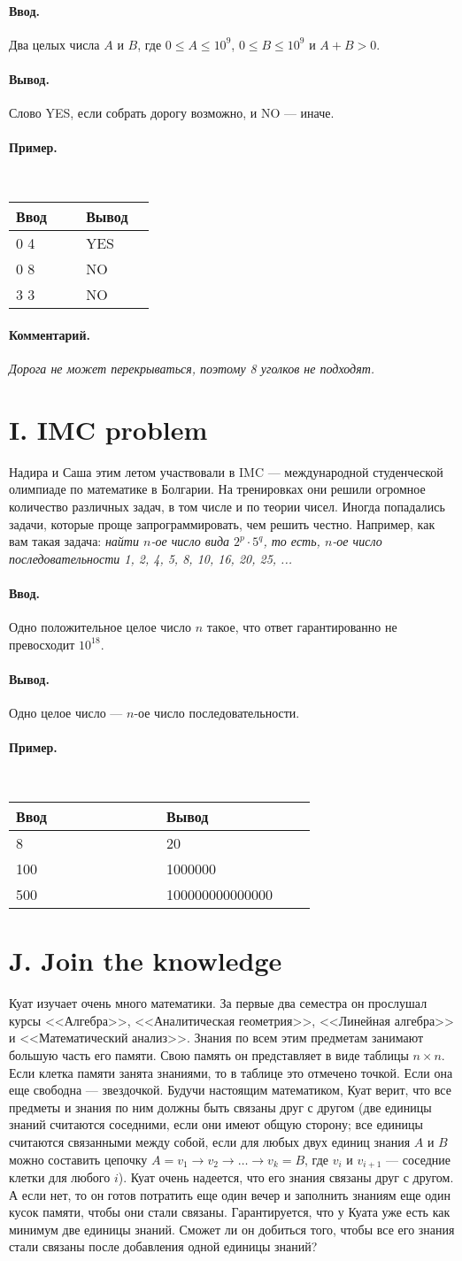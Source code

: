 \documentclass[10pt, a5paper]{article}
\newcommand{\informat}[1]
{
	\paragraph{Ввод.\\} #1
}
\newcommand{\outformat}[1]
{
	\paragraph{Вывод.\\} #1
}
\newcommand{\exampleee}[6]
{
	\paragraph{Пример.\\}
	{\tt
	\begin{tabular}{|p{0.4\linewidth}|p{0.4\linewidth}|}
	\hline
	Ввод 	& Вывод  	\\
	\hline
	#1 		& #2 		\\
	\hline
	#3		& #4		\\
	\hline
	#5		& #6		\\
	\hline
	\end{tabular}
	}
}
\newcommand{\excomm}[1]
{
	\paragraph{Комментарий. \\}
	\textit{#1}
}
\begin{document}
\informat{Два целых числа $A$ и $B$, где $0 \le A \le 10^9$, $0 \le B \le 10^9$ и $A + B > 0$.}

\outformat{Слово YES, если собрать дорогу возможно, и NO --- иначе.}

\exampleee{0 4}{YES}{0 8}{NO}{3 3}{NO}

\excomm{Дорога не может перекрываться, поэтому 8 уголков не подходят.}


\section*{I. IMC problem}

Надира и Саша этим летом участвовали в IMC --- международной студенческой олимпиаде по математике в Болгарии. На тренировках они решили огромное количество различных задач, в том числе и по теории чисел. Иногда попадались задачи, которые проще запрограммировать, чем решить честно. Например, как вам такая задача:\newline
\textit{найти $n$-ое число вида $2^p \cdot 5^q$, то есть, $n$-ое число последовательности 1, 2, 4, 5, 8, 10, 16, 20, 25, ...}

\informat{Одно положительное целое число $n$ такое, что ответ гарантированно не превосходит $10^{18}$.}

\outformat{Одно целое число --- $n$-ое число последовательности.}

\exampleee{8}{20}{100}{1000000}{500}{100000000000000}

\newpage

\section*{J. Join the knowledge}

Куат изучает очень много математики. За первые два семестра он прослушал курсы <<Алгебра>>, <<Аналитическая геометрия>>, <<Линейная алгебра>> и <<Математический анализ>>. Знания по всем этим предметам занимают большую часть его памяти. Свою память он представляет в виде таблицы $n \times n$. Если клетка памяти занята знаниями, то в таблице это отмечено точкой. Если она еще свободна --- звездочкой. Будучи настоящим математиком, Куат верит, что все предметы и знания по ним должны быть связаны друг с другом (две единицы знаний считаются соседними, если они имеют общую сторону; все единицы считаются связанными между собой, если для любых двух единиц знания $A$ и $B$ можно составить цепочку $A = v_1 \rightarrow v_2 \rightarrow \dots \rightarrow v_k = B$, где $v_i$ и $v_{i+1}$ --- соседние клетки для любого $i$). Куат очень надеется, что его знания связаны друг с другом. А если нет, то он готов потратить еще один вечер и заполнить знаниям еще один кусок памяти, чтобы они стали связаны. Гарантируется, что у Куата уже есть как минимум две единицы знаний. Сможет ли он добиться того, чтобы все его знания стали связаны после добавления одной единицы знаний?
\end{document}
